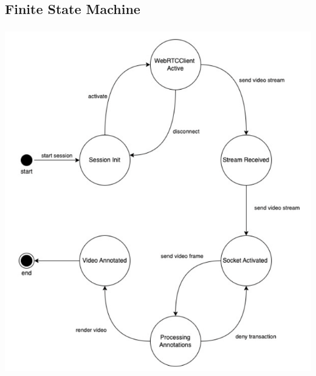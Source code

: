 \documentclass[12pt]{article}
\begin{document}
\subsection{Finite State Machine}
\includegraphics[width=15cm, height=15cm]{FSM.png}
\end{document}
